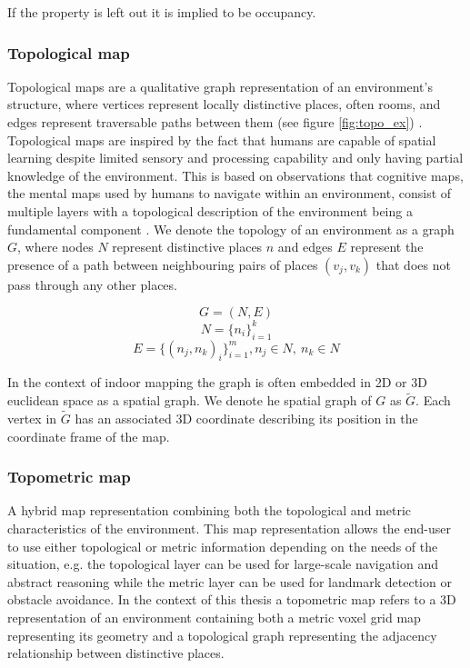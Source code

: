 If the property is left out it is implied to be occupancy.


\subsubsection{Topological map}
Topological maps are a qualitative graph representation of an environment's structure, where vertices represent locally distinctive places, often rooms, and edges represent traversable paths between them  (see figure \ref{fig:topo_ex}) \citep{thrun_learning_1998,kuipers_robust_1988}. Topological maps are inspired by the fact that humans are capable of spatial learning despite limited sensory and processing capability and only having partial knowledge of the environment. This is based on observations that cognitive maps, the mental maps used by humans to navigate within an environment, consist of multiple layers with a topological description of the environment being a fundamental component \citep{kuipers_robust_1988,kuipers_modeling_1978}. We denote the topology of an environment as a graph \(G\), where nodes \(N\) represent distinctive places \(n\) and edges \(E\) represent the presence of a path between neighbouring pairs of places \((v_j,v_k)\) that does not pass through any other places.

\begin{equation}
    \label{eq:G}
    G=(N, E)
\end{equation}
\begin{equation}
    \label{eq:V}
    N=\{n_i\}_{i=1}^k
\end{equation}
\begin{equation}
    \label{eq:E}
    E=\{(n_j,n_k)_i\}_{i=1}^m, n_j \in N,\ n_k \in N
\end{equation}

In the context of indoor mapping the graph is often embedded in 2D or 3D euclidean space as a spatial graph. We denote he spatial graph of \(G\) as \(\widetilde{G}\). Each vertex in \(\widetilde{G}\) has an associated 3D coordinate describing its position in the coordinate frame of the map. 

\subsubsection{Topometric map}
A hybrid map representation combining both the topological and metric characteristics of the environment. This map representation allows the end-user to use either topological or metric information depending on the needs of the situation, e.g. the topological layer can be used for large-scale navigation and abstract reasoning while the metric layer can be used for landmark detection or obstacle avoidance. In the context of this thesis a topometric map refers to a 3D representation of an environment containing both a metric voxel grid map representing its geometry and a topological graph representing the adjacency relationship between distinctive places. 

